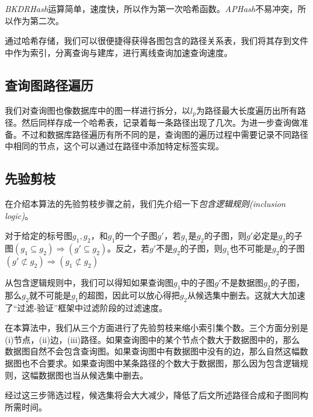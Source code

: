 \documentclass{XDBAthesis}
\numberwithin{algorithm}{chapter}
\begin{document}
\emph{BKDRHash}运算简单，速度快，所以作为第一次哈希函数。\emph{APHash}不易冲突，所以作为第二次。

通过哈希存储，我们可以很便捷得获得各图包含的路径关系表，我们将其存到文件中作为索引，分离查询与建库，进行离线查询加速查询速度。

\subsection{查询图路径遍历}
我们对查询图也像数据库中的图一样进行拆分，以$l_p $为路径最大长度遍历出所有路径。然后同样存成一个哈希表，记录着每一条路径出现了几次。为进一步查询做准备。不过和数据库路径遍历有所不同的是，查询图的遍历过程中需要记录不同路径中相同的节点，这个可以通过在路径中添加特定标签实现。
\subsection{先验剪枝}
    在介绍本算法的先验剪枝步骤之前，我们先介绍一下\emph{包含逻辑规则(inclusion logic)}。
    \begin{defn}
        对于给定的标号图$g_1 ,g_2 $，和$g_1 $的一个子图$g'$，若$g_1 $是$g_2 $的子图，则$g'$必定是$g_2 $的子图$(g_1 \subseteq g_2 ) \Rightarrow (g' \subseteq g_2  )$。反之，若$g'$不是$g_2 $的子图，则$g_1 $也不可能是$g_2 $的子图$(g' \not\subset g_2  )\Rightarrow (g_1 \not\subset g_2 )$    
    \end{defn}
    从包含逻辑规则中，我们可以得知如果查询图$g_1 $中的子图$g'$不是数据图$g_2 $的子图，那么$g_2 $就不可能是$g_1 $的超图，因此可以放心得把$g_2 $从候选集中删去。这就大大加速了“过滤-验证”框架中过滤阶段的过滤速度。
    
    在本算法中，我们从三个方面进行了先验剪枝来缩小索引集个数。三个方面分别是(i)节点，(ii)边，(iii)路径。如果查询图中的某个节点个数大于数据图中的，那么数据图自然不会包含查询图。如果查询图中有数据图中没有的边，那么自然这幅数据图也不合要求。如果查询图中某条路径的个数大于数据图，那么因为包含逻辑规则，这幅数据图也当从候选集中删去。
    
    经过这三步筛选过程，候选集将会大大减少，降低了后文所述路径合成和子图同构所需时间。
\end{document}
